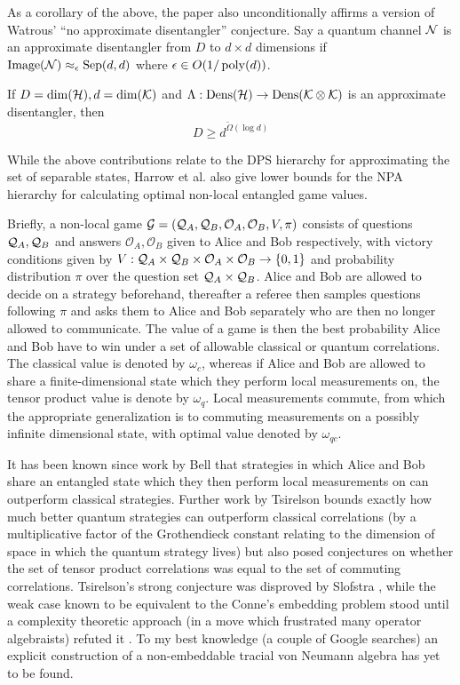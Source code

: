 \documentclass[runningheads,a4paper,english]{llncs}[2022/01/12]
\begin{document}
As a corollary of the above, the paper also unconditionally affirms a version of Watrous' ``no approximate disentangler'' conjecture.
Say a quantum channel $\mathcal{N}$ is an approximate disentangler from $D$ to $d\times d$ dimensions if $\operatorname{Image}(\mathcal{N}) \approx_{\epsilon} \operatorname{Sep}(d, d)$ where $\epsilon \in O(1/\operatorname{poly}(d))$.
\begin{theorem}
If $D = \dim(\mathcal{H}), d = \dim(\mathcal{K})$ and $\Lambda : \operatorname{Dens}(\mathcal{H}) \to \operatorname{Dens}(\mathcal{K}\otimes \mathcal{K})$ is an approximate disentangler, then
\[D \ge d^{\tilde{\Omega}(\log d)}\]
\end{theorem}
While the above contributions relate to the DPS hierarchy for approximating the set of separable states, Harrow et al. also give lower bounds for the NPA hierarchy for calculating optimal non-local entangled game values.

Briefly, a non-local game $\mathcal{G} = (\mathcal{Q}_A, \mathcal{Q}_B, \mathcal{O}_A, \mathcal{O}_B, V, \pi)$ consists of questions $\mathcal{Q}_A, \mathcal{Q}_B$ and answers $\mathcal{O}_A, \mathcal{O}_B$ given to Alice and Bob respectively, with victory conditions given by $V: \mathcal{Q}_A \times \mathcal{Q}_B \times \mathcal{O}_A \times \mathcal{O}_B \to \{0,1\}$ and probability distribution $\pi$ over the question set $\mathcal{Q}_A \times \mathcal{Q}_B$. 
Alice and Bob are allowed to decide on a strategy beforehand, thereafter a referee then samples questions following $\pi$ and asks them to Alice and Bob separately who are then no longer allowed to communicate.
The value of a game is then the best probability Alice and Bob have to win under a set of allowable classical or quantum correlations.
The classical value is denoted by $\omega_c$, whereas if Alice and Bob are allowed to share a finite-dimensional state which they perform local measurements on, the tensor product value is denote by $\omega_q$.
Local measurements commute, from which the appropriate generalization is to commuting measurements on a possibly infinite dimensional state, with optimal value denoted by $\omega_{qc}$.

It has been known since work by Bell \cite{PhysicsPhysiqueFizika.1.195} that strategies in which Alice and Bob share an entangled state which they then perform local measurements on can outperform classical strategies.
Further work by Tsirelson \cite{tsirelson1993some} bounds exactly how much better quantum strategies can outperform classical correlations (by a multiplicative factor of the Grothendieck constant relating to the dimension of space in which the quantum strategy lives) but also posed conjectures on whether the set of tensor product correlations was equal to the set of commuting correlations.
Tsirelson's strong conjecture was disproved by Slofstra \cite{Slofstra_2019}, while the weak case known to be equivalent to the Conne's embedding problem \cite{MR2790067} stood until a complexity theoretic approach (in a move which frustrated many operator algebraists) refuted it \cite{ji2021mip}. To my best knowledge (a couple of Google searches) an explicit construction of a non-embeddable tracial von Neumann algebra has yet to be found.
\end{document}
